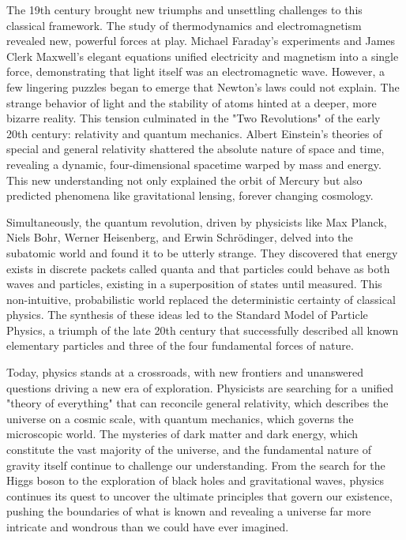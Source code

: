 \documentclass{article}
\begin{document}
The 19th century brought new triumphs and unsettling challenges to this classical framework. The study of thermodynamics and electromagnetism revealed new, powerful forces at play. Michael Faraday's experiments and James Clerk Maxwell's elegant equations unified electricity and magnetism into a single force, demonstrating that light itself was an electromagnetic wave. However, a few lingering puzzles began to emerge that Newton's laws could not explain. The strange behavior of light and the stability of atoms hinted at a deeper, more bizarre reality. This tension culminated in the "Two Revolutions" of the early 20th century: relativity and quantum mechanics. Albert Einstein’s theories of special and general relativity shattered the absolute nature of space and time, revealing a dynamic, four-dimensional spacetime warped by mass and energy. This new understanding not only explained the orbit of Mercury but also predicted phenomena like gravitational lensing, forever changing cosmology.

Simultaneously, the quantum revolution, driven by physicists like Max Planck, Niels Bohr, Werner Heisenberg, and Erwin Schrödinger, delved into the subatomic world and found it to be utterly strange. They discovered that energy exists in discrete packets called quanta and that particles could behave as both waves and particles, existing in a superposition of states until measured. This non-intuitive, probabilistic world replaced the deterministic certainty of classical physics. The synthesis of these ideas led to the Standard Model of Particle Physics, a triumph of the late 20th century that successfully described all known elementary particles and three of the four fundamental forces of nature.

Today, physics stands at a crossroads, with new frontiers and unanswered questions driving a new era of exploration. Physicists are searching for a unified "theory of everything" that can reconcile general relativity, which describes the universe on a cosmic scale, with quantum mechanics, which governs the microscopic world. The mysteries of dark matter and dark energy, which constitute the vast majority of the universe, and the fundamental nature of gravity itself continue to challenge our understanding. From the search for the Higgs boson to the exploration of black holes and gravitational waves, physics continues its quest to uncover the ultimate principles that govern our existence, pushing the boundaries of what is known and revealing a universe far more intricate and wondrous than we could have ever imagined.
\end{document}
